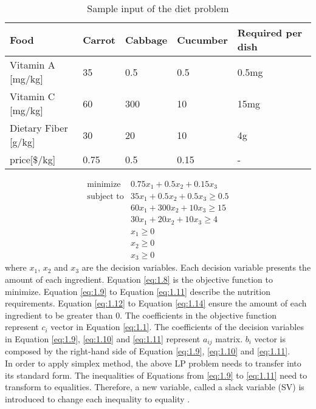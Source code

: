 \begin{table} 
\begin{center}
\begin{tabular}{| l | l  l  l | l |}
\hline
Food & Carrot & Cabbage & Cucumber & Required per dish \\ \hline
Vitamin A [mg/kg] & 35 & 0.5 & 0.5 & 0.5mg \\ 
Vitamin C [mg/kg] & 60 & 300 & 10 & 15mg \\ 
Dietary Fiber [g/kg] & 30 & 20 & 10 & 4g \\ \hline
price[$\$$/kg] & 0.75 & 0.5 & 0.15 & - \\ \hline
\end{tabular} 
\end{center}
\caption{Sample input of the diet problem}
\label{tab:1.1}
\end{table}	

\begin{eqnarray} 
\text{minimize} & 0.75x_{1} + 0.5x_{2} +  0.15x_{3}  \label{eq:1.8} \\
\text{subject to} & 35x_{1} + 0.5x_{2} + 0.5x_{3} \geq 0.5 \label{eq:1.9} \\
& 60x_{1} + 300x_{2} + 10x_{3} \geq 15 \label{eq:1.10} \\
& 30x_{1} + 20x_{2} + 10x_{3} \geq 4 \label{eq:1.11} \\
& x_{1} \geq 0  \label{eq:1.12} \\
& x_{2} \geq 0  \label{eq:1.13} \\
& x_{3} \geq 0  \label{eq:1.14}
\end{eqnarray} 
where $x_{1}$, $x_{2}$ and $x_{3}$ are the decision variables. Each decision variable presents the amount of each ingredient. Equation \ref{eq:1.8} is the objective function to minimize. Equation \ref{eq:1.9} to Equation \ref{eq:1.11} describe the nutrition requirements. Equation \ref{eq:1.12} to Equation \ref{eq:1.14} ensure the amount of each ingredient to be greater than 0. The coefficients in the objective function represent $c_{i}$ vector in Equation \ref{eq:1.1}. The coefficients of the decision variables in Equation \ref{eq:1.9}, \ref{eq:1.10} and \ref{eq:1.11} represent $a_{ij}$ matrix. $b_{i}$ vector is composed by the right-hand side of Equation \ref{eq:1.9}, \ref{eq:1.10} and \ref{eq:1.11}. \\

In order to apply simplex method, the above LP problem needs to transfer into its standard form. The inequalities of Equations from \ref{eq:1.9} to \ref{eq:1.11} need to transform to equalities. Therefore, a new variable, called a slack variable (SV) is introduced to change each inequality to equality \cite{ConvexOptimization}. \\

